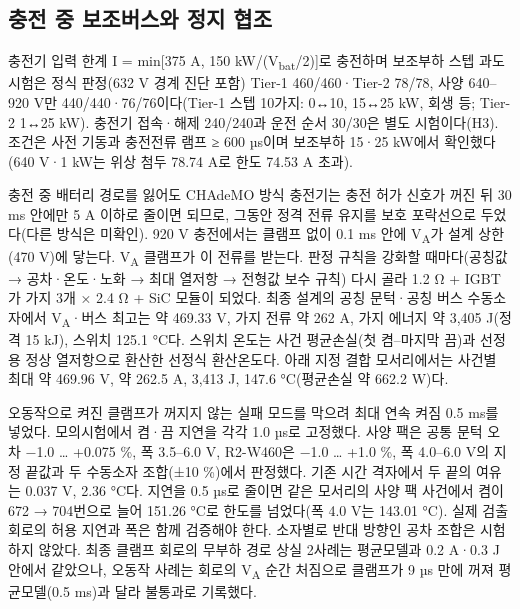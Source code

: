 \documentclass[10pt,a4paper,twocolumn]{article}
\begin{document}
\subsection{충전 중 보조버스와 정지 협조}
충전기 입력 한계 I = min[375 A, 150 kW/(V\textsubscript{bat}/2)]로 충전하며 보조부하 스텝 과도시험은 정식 판정(632 V 경계 진단 포함) Tier-1 460/460·Tier-2 78/78, 사양 640–920 V만 440/440·76/76이다(Tier-1 스텝 10가지: 0↔10, 15↔25 kW, 회생 등; Tier-2 1↔25 kW). 충전기 접속·해제 240/240과 운전 순서 30/30은 별도 시험이다(H3). 조건은 사전 기동과 충전전류 램프 ≥ 600 µs이며 보조부하 15·25 kW에서 확인했다(640 V·1 kW는 위상 첨두 78.74 A로 한도 74.53 A 초과).

충전 중 배터리 경로를 잃어도 CHAdeMO 방식 충전기는 충전 허가 신호가 꺼진 뒤 30 ms 안에만 5 A 이하로 줄이면 되므로\cite{r12}, 그동안 정격 전류 유지를 보호 포락선으로 두었다(다른 방식은 미확인). 920 V 충전에서는 클램프 없이 0.1 ms 안에 V\textsubscript{A}가 설계 상한(470 V)에 닿는다. V\textsubscript{A} 클램프가 이 전류를 받는다. 판정 규칙을 강화할 때마다(공칭값 → 공차·온도·노화 → 최대 열저항 → 전형값 보수 규칙) 다시 골라 1.2 Ω + IGBT가 가지 3개 × 2.4 Ω + SiC 모듈이 되었다. 최종 설계의 공칭 문턱·공칭 버스 수동소자에서 V\textsubscript{A}·버스 최고는 약 469.33 V, 가지 전류 약 262 A, 가지 에너지 약 3,405 J(정격 15 kJ), 스위치 125.1 °C다. 스위치 온도는 사건 평균손실(첫 켬–마지막 끔)과 선정용 정상 열저항으로 환산한 선정식 환산온도다. 아래 지정 결합 모서리에서는 사건별 최대 약 469.96 V, 약 262.5 A, 3,413 J, 147.6 °C(평균손실 약 662.2 W)다.


오동작으로 켜진 클램프가 꺼지지 않는 실패 모드를 막으려 최대 연속 켜짐 0.5 ms를 넣었다. 모의시험에서 켬·끔 지연을 각각 1.0 µs로 고정했다. 사양 팩은 공통 문턱 오차 −1.0 … +0.075 \%, 폭 3.5–6.0 V, R2-W460은 −1.0 … +1.0 \%, 폭 4.0–6.0 V의 지정 끝값과 두 수동소자 조합(±10 \%)에서 판정했다. 기존 시간 격자에서 두 끝의 여유는 0.037 V, 2.36 °C다. 지연을 0.5 µs로 줄이면 같은 모서리의 사양 팩 사건에서 켬이 672 → 704번으로 늘어 151.26 °C로 한도를 넘었다(폭 4.0 V는 143.01 °C). 실제 검출 회로의 허용 지연과 폭은 함께 검증해야 한다. 소자별로 반대 방향인 공차 조합은 시험하지 않았다. 최종 클램프 회로의 무부하 경로 상실 2사례는 평균모델과 0.2 A·0.3 J 안에서 같았으나, 오동작 사례는 회로의 V\textsubscript{A} 순간 처짐으로 클램프가 9 µs 만에 꺼져 평균모델(0.5 ms)과 달라 불통과로 기록했다.
\end{document}
